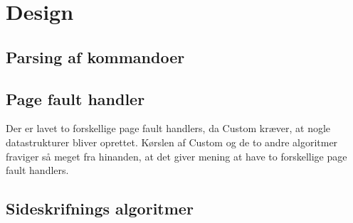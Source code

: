 \section{Design}
\label{sec:design}

\subsection{Parsing af kommandoer}

\subsection{Page fault handler}
Der er lavet to forskellige page fault handlers, da Custom kræver, at nogle datastrukturer bliver oprettet. Kørslen af Custom og de to andre algoritmer fraviger så meget fra hinanden, at det giver mening at have to forskellige page fault handlers.

\subsection{Sideskrifnings algoritmer}

